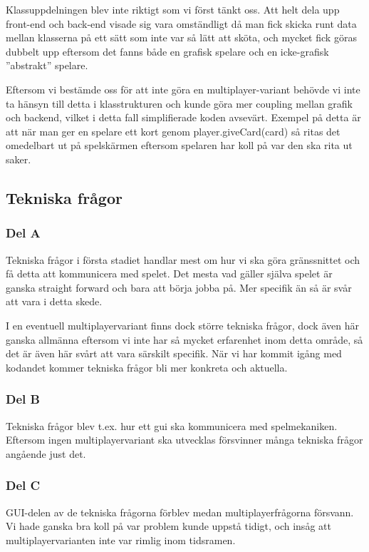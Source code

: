 \documentclass[10pt,a4paper]{article}
\begin{document}
Klassuppdelningen blev inte riktigt som vi först tänkt oss. Att helt dela
upp front-end och back-end visade sig vara omständligt då man fick skicka
runt data mellan klasserna på ett sätt som inte var så lätt att sköta, och
mycket fick göras dubbelt upp eftersom det fanns både en grafisk spelare
och en icke-grafisk ''abstrakt'' spelare.

Eftersom vi bestämde oss för att inte göra en multiplayer-variant behövde
vi inte ta hänsyn till detta i klasstrukturen och kunde göra mer coupling
mellan grafik och backend, vilket i detta fall simplifierade koden
avsevärt. Exempel på detta är att när man ger en spelare ett kort genom
player.giveCard(card) så ritas det omedelbart ut på spelskärmen eftersom
spelaren har koll på var den ska rita ut saker.

\subsection*{Tekniska frågor}

\subsubsection*{Del A}

Tekniska frågor i första stadiet handlar mest om hur vi ska göra
gränssnittet och få detta att kommunicera med spelet. Det mesta vad gäller
själva spelet är ganska straight forward och bara att börja jobba på. Mer
specifik än så är svår att vara i detta skede.

I en eventuell multiplayervariant finns dock större tekniska frågor, dock
även här ganska allmänna eftersom vi inte har så mycket erfarenhet inom
detta område, så det är även här svårt att vara särskilt specifik. När vi
har kommit igång med kodandet kommer tekniska frågor bli mer konkreta och
aktuella.

\subsubsection*{Del B}

Tekniska frågor blev t.ex. hur ett gui ska kommunicera med spelmekaniken.
Eftersom ingen multiplayervariant ska utvecklas försvinner många tekniska
frågor angående just det.

\subsubsection*{Del C}

GUI-delen av de tekniska frågorna förblev medan multiplayerfrågorna
försvann. Vi hade ganska bra koll på var problem kunde uppstå tidigt, och
insåg att multiplayervarianten inte var rimlig inom tidsramen.
\end{document}
